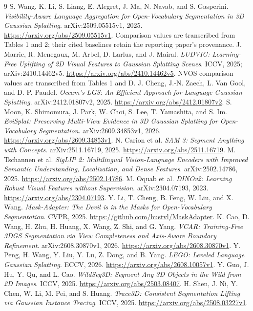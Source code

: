 \begin{thebibliography}{9}
S. Wang, K. Li, S. Liang, E. Alegret, J. Ma, N. Navab, and S. Gasperini.
\emph{Visibility-Aware Language Aggregation for Open-Vocabulary Segmentation
in 3D Gaussian Splatting}. arXiv:2509.05515v1, 2025.
\url{https://arxiv.org/abs/2509.05515v1}.
Comparison values are transcribed from Tables 1 and 2; their cited
baselines retain the reporting paper's provenance.
J. Marrie, R. Menegaux, M. Arbel, D. Larlus, and J. Mairal.
\emph{LUDVIG: Learning-Free Uplifting of 2D Visual Features to Gaussian
Splatting Scenes}. ICCV, 2025; arXiv:2410.14462v5.
\url{https://arxiv.org/abs/2410.14462v5}.
NVOS comparison values are transcribed from Tables 1 and D.
J. Cheng, J.-N. Zaech, L. Van Gool, and D. P. Paudel.
\emph{Occam's LGS: An Efficient Approach for Language Gaussian Splatting}.
arXiv:2412.01807v2, 2025.
\url{https://arxiv.org/abs/2412.01807v2}.
S. Moon, K. Shimomura, J. Park, W. Choi, S. Lee, T. Yamashita, and S. Im.
\emph{EviSplat: Preserving Multi-View Evidence in 3D Gaussian Splatting for
Open-Vocabulary Segmentation}. arXiv:2609.34853v1, 2026.
\url{https://arxiv.org/abs/2609.34853v1}.
N. Carion et al. \emph{SAM 3: Segment Anything with Concepts}.
arXiv:2511.16719, 2025. \url{https://arxiv.org/abs/2511.16719}.
M. Tschannen et al. \emph{SigLIP 2: Multilingual Vision-Language Encoders with
Improved Semantic Understanding, Localization, and Dense Features}.
arXiv:2502.14786, 2025. \url{https://arxiv.org/abs/2502.14786}.
M. Oquab et al. \emph{DINOv2: Learning Robust Visual Features without Supervision}.
arXiv:2304.07193, 2023. \url{https://arxiv.org/abs/2304.07193}.
Y. Li, T. Cheng, B. Feng, W. Liu, and X. Wang.
\emph{Mask-Adapter: The Devil is in the Masks for Open-Vocabulary Segmentation}.
CVPR, 2025. \url{https://github.com/hustvl/MaskAdapter}.
K. Cao, D. Wang, H. Zhu, H. Huang, X. Wang, Z. Shi, and G. Yang.
\emph{VCAR: Training-Free 3DGS Segmentation via View Completeness and Axis-Aware Boundary Refinement}.
arXiv:2608.30870v1, 2026. \url{https://arxiv.org/abs/2608.30870v1}.
Y. Peng, H. Wang, Y. Liu, Y. Lu, Z. Dong, and B. Yang.
\emph{LEGO: Leveled Language Gaussian Splatting}.
ECCV, 2026. \url{https://arxiv.org/abs/2608.10057v1}.
Y. Guo, J. Hu, Y. Qu, and L. Cao.
\emph{WildSeg3D: Segment Any 3D Objects in the Wild from 2D Images}.
ICCV, 2025. \url{https://arxiv.org/abs/2503.08407}.
H. Shen, J. Ni, Y. Chen, W. Li, M. Pei, and S. Huang.
\emph{Trace3D: Consistent Segmentation Lifting via Gaussian Instance Tracing}.
ICCV, 2025. \url{https://arxiv.org/abs/2508.03227v1}.
\end{thebibliography}
